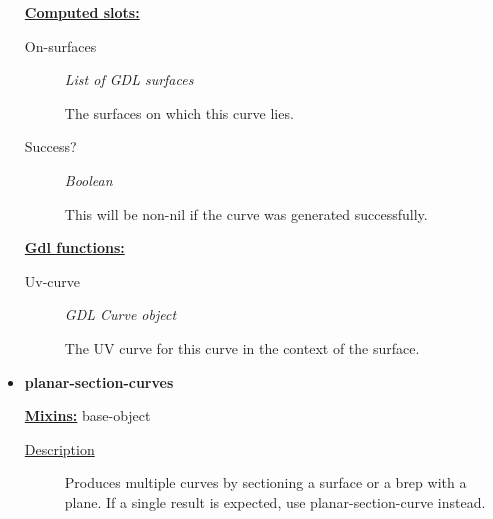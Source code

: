 \documentclass [11pt]{book}
\begin{document}
\begin{itemize}
\begin{description}
\end{description}






\textbf{
\underline{Computed slots:}}

\begin{description}

\item [On-surfaces]
\emph{List of GDL surfaces}

 The surfaces on which this curve lies.




\item [Success?]
\emph{Boolean}

 This will be non-nil if the curve was generated successfully.




\end{description}






\textbf{
\underline{Gdl functions:}}

\begin{description}

\item [Uv-curve]
\emph{GDL Curve object}

 The UV curve for this curve in the context of the surface.




\end{description}







\item {}
\label{prim:planar-section-curves}
\textbf{planar-section-curves}


\textbf{
\underline{Mixins:}} base-object





\begin{description}

\item [
\underline{Description}]


Produces multiple curves by sectioning a surface or a brep with a plane.
If a single result is expected, use planar-section-curve instead.




\end{description}
\end{itemize}
\end{document}
